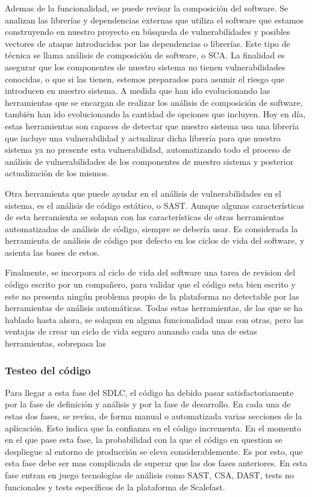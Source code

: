 \documentclass[12pt]{report} %
\begin{document}
Ademas de la funcionalidad, se puede revisar la composición del software.  Se
analizan las librerías y dependencias externas que utiliza el software que
estamos construyendo en nuestro proyecto en búsqueda de vulnerabilidades y
posibles vectores de ataque introducidos por las dependencias o librerías.  Este
tipo de técnica se llama análisis de composición de software, o \gls{SCA}.  La
finalidad es asegurar que los componentes de nuestro sistema no tienen
vulnerabilidades conocidas, o que si las tienen, estemos preparados para asumir
el riesgo que introducen en nuestro sistema.  A medida que han ido evolucionando
las herramientas que se encargan de realizar los análisis de composición de
software, también han ido evolucionando la cantidad de opciones que incluyen.
Hoy en día, estas herramientas son capaces de detectar que nuestro sistema usa
una librería que incluye una vulnerabilidad y actualizar dicha librería para que
nuestro sistema ya no presente esta vulnerabilidad, automatizando todo el
proceso de análisis de vulnerabilidades de los componentes de nuestro sistema y
posterior actualización de los mismos.

Otra herramienta que puede ayudar en el análisis de vulnerabilidades en el
sistema, es el análisis de código estático, o \gls{SAST}.  Aunque algunas
características de esta herramienta se solapan con las características de otras
herramientas automatizadas de análisis de código, siempre se debería usar.  Es
considerada la herramienta de análisis de código por defecto en los ciclos de
vida del software, y asienta las bases de estos.

Finalmente, se incorpora al ciclo de vida del software una tarea de revision del
código escrito por un compañero, para validar que el código esta bien escrito y
este no presenta ningún problema propio de la plataforma no detectable por las
herramientas de análisis automáticas. Todas estas herramientas, de las que se ha
hablado hasta ahora, se solapan en alguna funcionalidad unas con otras, pero las
ventajas de crear un ciclo de vida seguro aunando cada una de estas
herramientas, sobrepasa las 


\subsubsection{Testeo del código}

Para llegar a esta fase del \gls{SDLC}, el código ha debido pasar
satisfactoriamente por la fase de definición y análisis y por la fase de
desarrollo.  En cada una de estas dos fases, se revisa, de forma manual o
automatizada varias secciones de la aplicación.  Esto indica que la confianza en
el código incrementa.  En el momento en el que pase esta fase, la probabilidad
con la que el código en question se despliegue al entorno de producción se eleva
considerablemente.  Es por esto, que esta fase debe ser mas complicada de
superar que las dos fases anteriores.  En esta fase entran en juego tecnologías
de análisis como \gls{SAST}, \gls{CSA}, \gls{DAST}, tests no funcionales y tests
específicos de la plataforma de Scalefast.
\end{document}
